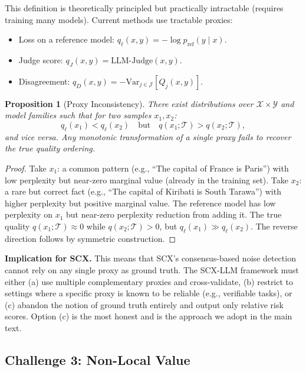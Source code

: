 \documentclass[11pt]{article}
\newtheorem{proposition}{Proposition}[section]
\newcommand{\cX}{\mathcal{X}}
\newcommand{\cY}{\mathcal{Y}}
\newcommand{\cJ}{\mathcal{J}}
\newcommand{\cT}{\mathcal{T}}
\begin{document}
This definition is theoretically principled but practically intractable (requires training many models). Current methods use tractable proxies:
\begin{itemize}
    \item Loss on a reference model: $q_{\ell}(x, y) = -\log p_{\text{ref}}(y \mid x)$.
    \item Judge score: $q_J(x, y) = \text{LLM-Judge}(x, y)$.
    \item Disagreement: $q_D(x, y) = -\text{Var}_{j \in \cJ}[Q_j(x, y)]$.
\end{itemize}

\begin{proposition}[Proxy Inconsistency]
There exist distributions over $\cX \times \cY$ and model families such that for two samples $x_1, x_2$:
\begin{equation}
q_{\ell}(x_1) < q_{\ell}(x_2) \quad \text{but} \quad q(x_1; \cT) > q(x_2; \cT),
\label{eq:proxy_inconsistency}
\end{equation}
and vice versa. Any monotonic transformation of a single proxy fails to recover the true quality ordering.
\end{proposition}

\begin{proof}
Take $x_1$: a common pattern (e.g., ``The capital of France is Paris'') with low perplexity but near-zero marginal value (already in the training set). Take $x_2$: a rare but correct fact (e.g., ``The capital of Kiribati is South Tarawa'') with higher perplexity but positive marginal value. The reference model has low perplexity on $x_1$ but near-zero perplexity reduction from adding it. The true quality $q(x_1; \cT) \approx 0$ while $q(x_2; \cT) > 0$, but $q_{\ell}(x_1) \gg q_{\ell}(x_2)$. The reverse direction follows by symmetric construction.
\end{proof}

\textbf{Implication for SCX.} This means that SCX's consensus-based noise detection cannot rely on any single proxy as ground truth. The SCX-LLM framework must either (a) use multiple complementary proxies and cross-validate, (b) restrict to settings where a specific proxy is known to be reliable (e.g., verifiable tasks), or (c) abandon the notion of ground truth entirely and output only relative risk scores. Option (c) is the most honest and is the approach we adopt in the main text.

\subsection{Challenge 3: Non-Local Value}
\end{document}
